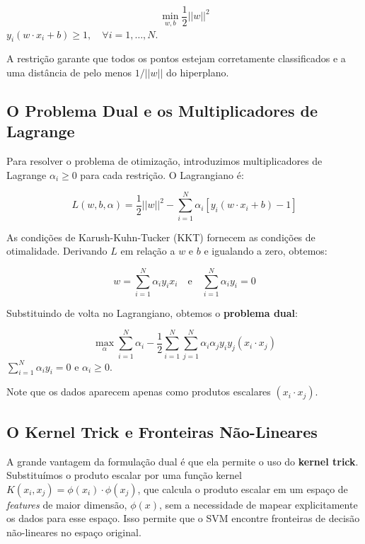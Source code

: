 \documentclass[12pt, a4paper, oneside]{report}
\begin{document}
\begin{equation}
    \min_{w, b} \frac{1}{2} ||w||^2
\end{equation}
 $y_i(w \cdot x_i + b) \ge 1, \quad \forall i=1, \dots, N$.

A restrição garante que todos os pontos estejam corretamente classificados e a uma distância de pelo menos $1/||w||$ do hiperplano.

\subsection{O Problema Dual e os Multiplicadores de Lagrange}

Para resolver o problema de otimização, introduzimos multiplicadores de Lagrange $\alpha_i \ge 0$ para cada restrição. O Lagrangiano é:

\begin{equation}
    L(w, b, \alpha) = \frac{1}{2} ||w||^2 - \sum_{i=1}^N \alpha_i [y_i(w \cdot x_i + b) - 1]
\end{equation}

As condições de Karush-Kuhn-Tucker (KKT) fornecem as condições de otimalidade. Derivando $L$ em relação a $w$ e $b$ e igualando a zero, obtemos:

\begin{equation}
    w = \sum_{i=1}^N \alpha_i y_i x_i \quad \text{e} \quad \sum_{i=1}^N \alpha_i y_i = 0
\end{equation}

Substituindo de volta no Lagrangiano, obtemos o \textbf{problema dual}:

\begin{equation}
    \max_{\alpha} \sum_{i=1}^N \alpha_i - \frac{1}{2} \sum_{i=1}^N \sum_{j=1}^N \alpha_i \alpha_j y_i y_j (x_i \cdot x_j)
\end{equation}
 $\sum_{i=1}^N \alpha_i y_i = 0$ e $\alpha_i \ge 0$.

Note que os dados aparecem apenas como produtos escalares $(x_i \cdot x_j)$.

\subsection{O Kernel Trick e Fronteiras Não-Lineares}

A grande vantagem da formulação dual é que ela permite o uso do \textbf{kernel trick}. Substituímos o produto escalar por uma função kernel $K(x_i, x_j) = \phi(x_i) \cdot \phi(x_j)$, que calcula o produto escalar em um espaço de \textit{features} de maior dimensão, $\phi(x)$, sem a necessidade de mapear explicitamente os dados para esse espaço. Isso permite que o SVM encontre fronteiras de decisão não-lineares no espaço original.
\end{document}
